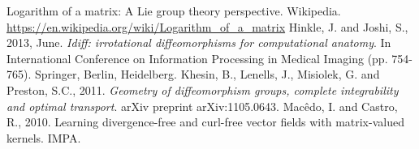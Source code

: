 \documentclass{article}
\theoremstyle{definition}
\theoremstyle{plain}
\begin{document}
\begin{thebibliography}{99}
Logarithm of a matrix: A Lie group theory perspective. Wikipedia. \url{https://en.wikipedia.org/wiki/Logarithm_of_a_matrix}
Hinkle, J. and Joshi, S., 2013, June. \textit{Idiff: irrotational diffeomorphisms for computational anatomy}. In International Conference on Information Processing in Medical Imaging (pp. 754-765). Springer, Berlin, Heidelberg.
Khesin, B., Lenells, J., Misiolek, G. and Preston, S.C., 2011. \textit{Geometry of diffeomorphism groups, complete integrability and optimal transport}. arXiv preprint arXiv:1105.0643.
Macêdo, I. and Castro, R., 2010. Learning divergence-free and curl-free vector fields with matrix-valued kernels. IMPA.
\end{thebibliography}
\end{document}
